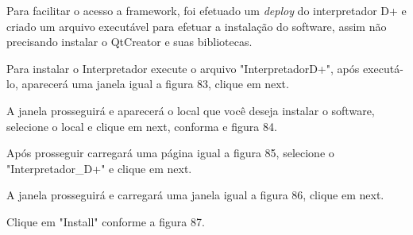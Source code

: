 \documentclass[12pt,oneside,a4paper,chapter=TITLE,section=TITLE,sumario=tradicional]{abntex2}
\begin{document}
\begin{figure}[htb]
\end{figure}


Para facilitar o acesso a framework, foi efetuado um \textit{deploy} do interpretador D+ e criado um arquivo executável para efetuar a instalação do software, assim não precisando instalar o QtCreator e suas bibliotecas.

Para instalar o Interpretador execute o arquivo "InterpretadorD+", após executá-lo, aparecerá uma janela igual a figura 83, clique em next.

\begin{figure}[!htb]
\end{figure}

A janela prosseguirá e aparecerá o local que você deseja instalar o software, selecione o local e clique em next, conforma e figura 84.

\begin{figure}[H]
\end{figure}

Após prosseguir carregará uma página igual a figura 85, selecione o "Interpretador\_D+" e clique em next.

\begin{figure}[H]
\end{figure}

A janela prosseguirá e carregará uma janela igual a figura 86, clique em next.

\begin{figure}[H]
\end{figure}

Clique em "Install" conforme a figura 87.

\begin{figure}[H]
\end{figure}
\end{document}
